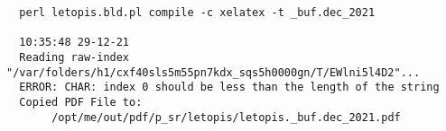  
 
 
 
 

\begin{verbatim}
  perl letopis.bld.pl compile -c xelatex -t _buf.dec_2021
  
  10:35:48 29-12-21
  Reading raw-index "/var/folders/h1/cxf40sls5m55pn7kdx_sqs5h0000gn/T/EWlni5l4D2"...
  ERROR: CHAR: index 0 should be less than the length of the string
  Copied PDF File to:
       /opt/me/out/pdf/p_sr/letopis/letopis._buf.dec_2021.pdf
\end{verbatim}
